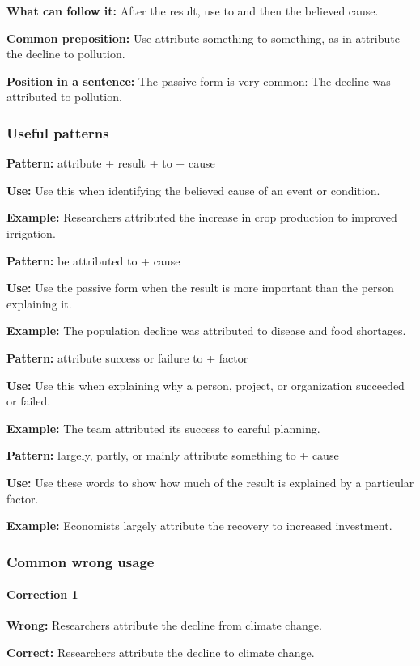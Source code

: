 \documentclass[11pt]{article}
\begin{document}
\textbf{What can follow it:} After the result, use to and then the believed cause.

\textbf{Common preposition:} Use attribute something to something, as in attribute the decline to pollution.

\textbf{Position in a sentence:} The passive form is very common: The decline was attributed to pollution.

\subsubsection{Useful patterns}
\textbf{Pattern:} attribute + result + to + cause

\textbf{Use:} Use this when identifying the believed cause of an event or condition.

\textbf{Example:} Researchers attributed the increase in crop production to improved irrigation.

\textbf{Pattern:} be attributed to + cause

\textbf{Use:} Use the passive form when the result is more important than the person explaining it.

\textbf{Example:} The population decline was attributed to disease and food shortages.

\textbf{Pattern:} attribute success or failure to + factor

\textbf{Use:} Use this when explaining why a person, project, or organization succeeded or failed.

\textbf{Example:} The team attributed its success to careful planning.

\textbf{Pattern:} largely, partly, or mainly attribute something to + cause

\textbf{Use:} Use these words to show how much of the result is explained by a particular factor.

\textbf{Example:} Economists largely attribute the recovery to increased investment.

\subsubsection{Common wrong usage}
\paragraph{Correction 1}
\textbf{Wrong:} Researchers attribute the decline from climate change.

\textbf{Correct:} Researchers attribute the decline to climate change.
\end{document}
